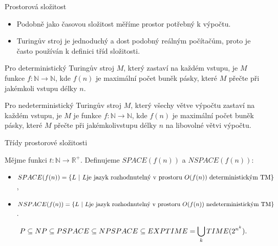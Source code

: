     
    \begin{frame}{Prostorová složitost}
    \begin{itemize}
        \item Podobně jako časovou složitost měříme prostor potřebný k výpočtu.
        \item Turingův stroj je jednoduchý a dost podobný reálným počítačům, proto je často používán k definici tříd složitosti.
    \end{itemize}
    \begin{definition}
    Pro deterministický Turingův stroj $M$, který zastaví na každém vstupu, je
     $M$ funkce $f:\mathbb{N}\to \mathbb{N}$, kde $f(n)$ je maximální počet buněk pásky, které  $M$ přečte při jakémkoli vstupu délky $n$.
    
    
    Pro nedeterministický Turingův stroj $M$, který všechy větve výpočtu zastaví na každém vstupu, je 
     $M$ je funkce $f:\mathbb{N}\to \mathbb{N}$, kde $f(n)$ je maximální počet buněk pásky, které  $M$ přečte při jakémkolivstupu délky $n$ na libovolné větvi výpočtu.
    
    \end{definition}
    \end{frame}
    
    \begin{frame}{Třídy prostorové složitosti}
    \begin{definition}
    Mějme funkci $t: \mathbb{N}\to \mathbb{R}^+$. Definujeme  $SPACE(f(n))$ a $NSPACE(f(n))$: %
    \begin{itemize}
        \item $SPACE(f(n))=\{L \ |\  L \hbox{je jazyk rozhodnutelný v prostoru $O(f(n))$ deterministickým TM}\}$,
        \item $NSPACE(f(n))=\{L \ |\  L \hbox{je jazyk rozhodnutelný v prostoru $O(f(n))$ nedeterministickým TM}\}$.
    \end{itemize}
    \end{definition}
    
    \begin{theorem}
    $$P \subseteq NP \subseteq PSPACE \subseteq NPSPACE \subseteq EXPTIME = \bigcup_k TIME(2^{n^k})\hbox{.} $$
    \end{theorem}
    
    \end{frame}